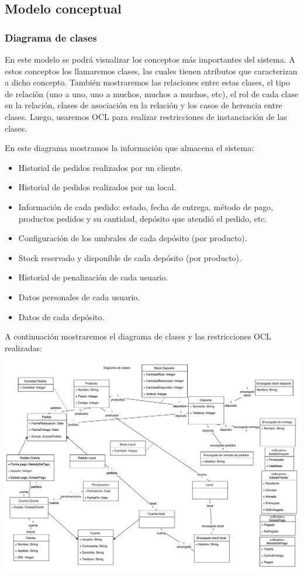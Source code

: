 \subsection{Modelo conceptual}

\subsubsection{Diagrama de clases}

En este modelo se podrá visualizar los conceptos más importantes del sistema. A estos conceptos los llamaremos clases, las cuales tienen atributos que caracterizan a dicho concepto. También mostraremos las relaciones entre estas clases, el tipo de relación (uno a uno, uno a muchos, muchos a muchos, etc), el rol de cada clase en la relación, clases de asociación en la relación y los casos de herencia entre clases.
Luego, usaremos OCL para realizar restricciones de instanciación de las clases.

En este diagrama mostramos la información que almacena el sistema:
\begin{itemize}
\item Historial de pedidos realizados por un cliente.
\item Historial de pedidos realizados por un local.
\item Información de cada pedido: estado, fecha de entrega, método de pago, productos pedidos y su cantidad, depósito que atendió el pedido, etc.
\item Configuración de los umbrales de cada depósito (por producto).
\item Stock reservado y disponible de cada depósito (por producto).
\item Historial de penalización de cada usuario.
\item Datos personales de cada usuario.
\item Datos de cada depósito.
\end{itemize}

A continuación mostraremos el diagrama de clases y las restricciones OCL realizadas:

\includegraphics[scale=0.5, angle=90]{secciones/diagramaClases}
\newpage

